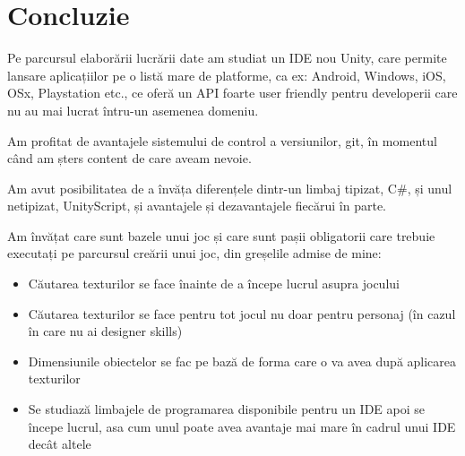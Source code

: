 \section*{Concluzie}

Pe parcursul elaborării lucrării date am studiat un IDE nou Unity, care permite lansare aplicațiilor pe o listă mare de platforme, ca ex: Android, Windows, iOS, OSx, Playstation etc., ce oferă un API foarte user friendly pentru developerii care nu au mai lucrat întru-un asemenea domeniu. 

Am profitat de avantajele sistemului de control a versiunilor, git, în momentul când am șters content de care aveam nevoie.

Am avut posibilitatea de a învăța diferențele dintr-un limbaj tipizat, C\#, și unul netipizat, UnityScript, și avantajele și dezavantajele fiecărui în parte.

Am învățat care sunt bazele unui joc și care sunt pașii obligatorii care trebuie executați pe parcursul creării unui joc, din greșelile admise de mine:
\begin{itemize}
	\item Căutarea texturilor se face înainte de a începe lucrul asupra jocului
	\item Căutarea texturilor se face pentru tot jocul nu doar pentru personaj (în cazul în care nu ai designer skills)
	\item Dimensiunile obiectelor se fac pe bază de forma care o va avea după aplicarea texturilor
	\item Se studiază limbajele de programarea disponibile pentru un IDE apoi se începe lucrul, asa cum unul poate avea avantaje mai mare în cadrul unui IDE decât altele
\end{itemize}


\clearpage